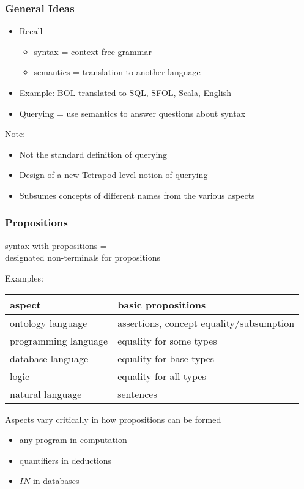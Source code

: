 \begin{frame}\frametitle{General Ideas}
\begin{itemize}
\item Recall
 \begin{itemize}
 \item syntax = context-free grammar
 \item semantics = translation to another language
 \end{itemize}
\item Example: BOL translated to SQL, SFOL, Scala, English
\item Querying = use semantics to answer questions about syntax
\end{itemize}
\medskip

Note:
\begin{itemize}
\item Not the standard definition of querying
\item Design of a new Tetrapod-level notion of querying
\item Subsumes concepts of different names from the various aspects
\end{itemize}
\end{frame}

\begin{frame}\frametitle{Propositions}
syntax with propositions = \\
designated non-terminals for propositions
\medskip

Examples:
\begin{center}
\footnotesize
\begin{tabular}{l|l}
aspect & basic propositions\\
\hline
ontology language & assertions, concept equality/subsumption\\
programming language & equality for some types\\
database language & equality for base types \\
logic & equality for all types\\
natural language & sentences \\
\end{tabular}
\end{center}

Aspects vary critically in how propositions can be formed
\begin{itemize}
\item any program in computation
\item quantifiers in deductions 
\item $IN$ in databases
\end{itemize}
\end{frame}

